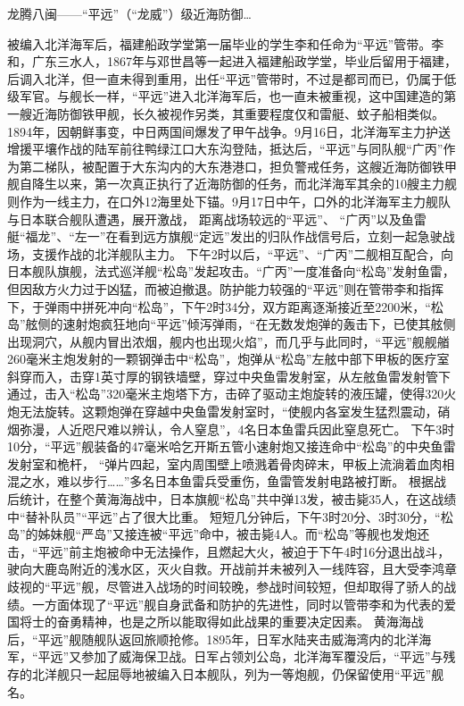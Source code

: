 \documentclass[12pt,UTF8]{ctexbook}
\begin{document}
龙腾八闽——“平远”（“龙威”）级近海防御…

被编入北洋海军后，福建船政学堂第一届毕业的学生李和任命为“平远”管带。李和，广东三水人，1867年与邓世昌等一起进入福建船政学堂，毕业后留用于福建，后调入北洋，但一直未得到重用，出任“平远”管带时，不过是都司而已，仍属于低级军官。与舰长一样，“平远”进入北洋海军后，也一直未被重视，这中国建造的第一艘近海防御铁甲舰，长久被视作另类，其重要程度仅和雷艇、蚊子船相类似。
1894年，因朝鲜事变，中日两国间爆发了甲午战争。9月16日，北洋海军主力护送增援平壤作战的陆军前往鸭绿江口大东沟登陆，抵达后，“平远”与同队舰“广丙”作为第二梯队，被配置于大东沟内的大东港港口，担负警戒任务，这艘近海防御铁甲舰自降生以来，第一次真正执行了近海防御的任务，而北洋海军其余的10艘主力舰则作为一线主力，在口外12海里处下锚。9月17日中午，口外的北洋海军主力舰队与日本联合舰队遭遇，展开激战， 距离战场较远的“平远”、 “广丙”以及鱼雷艇“福龙”、“左一”在看到远方旗舰“定远”发出的归队作战信号后，立刻一起急驶战场，支援作战的北洋舰队主力。
下午2时以后，“平远”、“广丙”二舰相互配合，向日本舰队旗舰，法式巡洋舰“松岛”发起攻击。“广丙”一度准备向“松岛”发射鱼雷，但因敌方火力过于凶猛，而被迫撤退。防护能力较强的“平远”则在管带李和指挥下，于弹雨中拼死冲向“松岛”，下午2时34分，双方距离逐渐接近至2200米，“松岛”舷侧的速射炮疯狂地向“平远”倾泻弹雨，“在无数发炮弹的轰击下，已使其舷侧出现洞穴，从舰内冒出浓烟，舰内也出现火焰”，而几乎与此同时，“平远”舰舰艏260毫米主炮发射的一颗钢弹击中“松岛”，炮弹从“松岛”左舷中部下甲板的医疗室斜穿而入，击穿1英寸厚的钢铁墙壁，穿过中央鱼雷发射室，从左舷鱼雷发射管下通过，击入“松岛”320毫米主炮塔下方，击碎了驱动主炮旋转的液压罐，使得320火炮无法旋转。这颗炮弹在穿越中央鱼雷发射室时，“使舰内各室发生猛烈震动，硝烟弥漫，人近咫尺难以辨认，令人窒息”，4名日本鱼雷兵因此窒息死亡。
下午3时10分，“平远”舰装备的47毫米哈乞开斯五管小速射炮又接连命中“松岛”的中央鱼雷发射室和桅杆， “弹片四起，室内周围壁上喷溅着骨肉碎末，甲板上流淌着血肉相混之水，难以步行……”多名日本鱼雷兵受重伤，鱼雷管发射电路被打断。 根据战后统计，在整个黄海海战中，日本旗舰“松岛”共中弹13发，被击毙35人，在这战绩中“替补队员”“平远”占了很大比重。
短短几分钟后，下午3时20分、3时30分，“松岛”的姊妹舰“严岛”又接连被“平远”命中，被击毙4人。而“松岛”等舰也发炮还击，“平远”前主炮被命中无法操作，且燃起大火，被迫于下午4时16分退出战斗，驶向大鹿岛附近的浅水区，灭火自救。开战前并未被列入一线阵容，且大受李鸿章歧视的“平远”舰，尽管进入战场的时间较晚，参战时间较短，但却取得了骄人的战绩。一方面体现了“平远”舰自身武备和防护的先进性，同时以管带李和为代表的爱国将士的奋勇精神，也是之所以能取得如此战果的重要决定因素。
黄海海战后，“平远”舰随舰队返回旅顺抢修。1895年，日军水陆夹击威海湾内的北洋海军，“平远”又参加了威海保卫战。日军占领刘公岛，北洋海军覆没后，“平远”与残存的北洋舰只一起屈辱地被编入日本舰队，列为一等炮舰，仍保留使用“平远”舰名。
\end{document}
